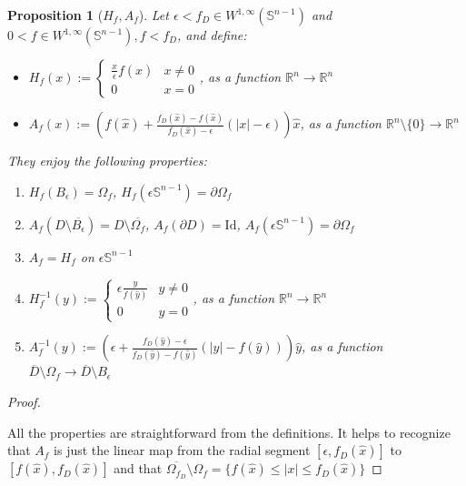 \documentclass[english,a4paper,12pt,oneside]{scrbook}
\theoremstyle{break}
\newtheorem{prop}[equation]{Proposition}
\newenvironment{mproof}[1][\proofname]{%
  \begin{proof}[#1]$ $\par\nobreak\ignorespaces
}{%
  \end{proof}
}
\renewcommand*{\proofname}{Proof}
\theoremstyle{remark}
\newcommand{\mR}{\mathbb{R}}
\newcommand{\mS}{\mathbb{S}^{n-1}}
\newcommand{\ds}{\displaystyle}
\newcommand{\id}{\text{Id}}
\newcommand{\xh}{\hat{x}}
\newcommand{\yh}{\hat{y}}
\newcommand{\eps}{\epsilon}
\begin{document}
\begin{prop}[$H_f, A_f$]
Let $\eps <f_D \in W^{1,\infty}(\mS)$ and $0<f \in W^{1,\infty}(\mS), f<f_D$, and define:
\begin{itemize}
	\item $H_f(x):=\ds \left\{\begin{matrix}
\frac{x}{\epsilon}f(\hat{x}) &  x\neq 0\\ 
0 & x=0
\end{matrix}\right. $, as a function $\mR^n\rightarrow \mR^n$
	\item $A_f(x):=\left (  f(\xh)+\frac{f_D(\xh)-f(\xh)}{f_D(\xh)-\eps}(|x|-\eps) \right )\xh$, as a function $\mR^n\setminus\{0\}\rightarrow \mR^n$
\end{itemize}

They enjoy the following properties:

\begin{enumerate}
	\item $H_f(B_\eps)=\Omega_f$, $H_f(\eps \mS) = \partial \Omega_f$
	\item $A_f(D\setminus \overline{B_\eps}) = D\setminus \overline{\Omega_f}$, $A_f(\partial D) = \id$, $A_f(\eps \mS) = \partial \Omega_f$
	\item $A_f=H_f$ on $\eps\mS$
	\item $H_f^{-1}(y):=\ds \left\{\begin{matrix}
\epsilon \frac{y}{f(\hat{y})} &  y\neq 0\\ 
0 & y=0
\end{matrix}\right. $, as a function $\mR^n\rightarrow \mR^n$
	\item $A_f^{-1}(y):=\left (  \eps+\frac{f_D(\yh)-\eps}{f_D(\yh)-f(\yh)}(|y|-f(\yh)) \right )\yh$, as a function $\overline{D}\setminus \Omega_f \rightarrow \overline{D}\setminus B_\eps$
\end{enumerate}

\end{prop}

\begin{mproof}
All the properties are straightforward from the definitions. It helps to recognize that $A_f$ is just the linear map from the radial segment $[\eps, f_D(\xh)]$ to $[f(\xh), f_D(\xh)]$ and that $\overline{\Omega_{f_D}} \setminus \Omega_f = \{f(\xh)\leq|x|\leq f_D(\xh)\}$
\end{mproof}
\end{document}
